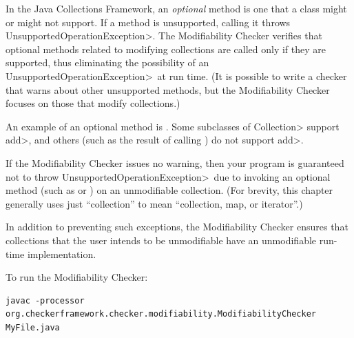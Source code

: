 
\newcommand{\UnsupportedOperationException}{\<Un\-sup\-port\-ed\-Op\-er\-a\-tion\-Ex\-cep\-tion>}

In the Java Collections Framework, an \emph{optional} method is one that a class might or might not support.
If a method is unsupported, calling it throws \UnsupportedOperationException.
The Modifiability Checker verifies that optional methods related to modifying collections are
called only if they are supported, thus eliminating the possibility of an
\UnsupportedOperationException\  at run time.
(It is possible to write a checker that warns about other unsupported
methods, but the Modifiability Checker focuses on those that modify collections.)

An example of an optional method is
.  Some
subclasses of \<Collection> support \<add>, and others (such as the
result of calling
)
do not support \<add>.

If the Modifiability Checker issues no warning, then your program is
guaranteed not to throw \UnsupportedOperationException\ due to invoking an
optional method (such as
 or
)
on an unmodifiable collection.
(For brevity, this chapter generally uses
just ``collection'' to mean ``collection, map, or iterator''.)

In addition to preventing such exceptions, the Modifiability Checker ensures that collections
that the user intends to be unmodifiable have an unmodifiable run-time implementation.


To run the Modifiability Checker:

\begin{Verbatim}
javac -processor org.checkerframework.checker.modifiability.ModifiabilityChecker MyFile.java
\end{Verbatim}



